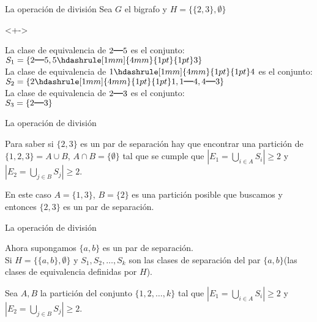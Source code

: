 \documentclass[spanish]{beamer}
\begin{document}
\begin{frame}{La operación de división}
  Sea $G$ el bigrafo y $H=\{\{2, 3\},  \emptyset\}$
\begin{example}<+->
  \centering
  \end{example}
  \begin{block}{}
 La clase de equivalencia de $2\rule[1mm]{4mm}{0.3mm}5$ es el conjunto:\\
$S_{1} = \{2\rule[1mm]{4mm}{0.3mm}5, 5 \hdashrule[1mm]{4mm}{1pt}{1pt} 3\}$\\
La clase de equivalencia de $1\hdashrule[1mm]{4mm}{1pt}{1pt} 4$ es el conjunto:\\
$S_{2} = \{2 \hdashrule[1mm]{4mm}{1pt}{1pt} 1, 1\rule[1mm]{4mm}{0.3mm}4, 4\rule[1mm]{4mm}{0.3mm}3\}$\\
La clase de equivalencia de $2\rule[1mm]{4mm}{0.3mm}3$ es el conjunto:\\
$S_{3} = \{2\rule[1mm]{4mm}{0.3mm}3\}$\\ 
  \end{block}
\end{frame}

\begin{frame}{La operación de división}
\begin{block}{}
Para saber si $\{2,3\}$ es un par de separación hay que encontrar una partición de $\{1, 2, 3\} = A \cup B$, $A \cap B = \{\emptyset\}$ tal que se cumple que $|E_{1} = \bigcup_{i \in A} S_i| \geq 2$ y $ |E_{2}= \bigcup_{j \in B} S_j| \geq 2$.\\
\end{block}
\begin{block}{}
 En este caso $A = \{1, 3\}$, $B=\{2\}$ es una partición posible que buscamos y entonces  $\{2, 3\}$ es un par de separación.\\
\end{block}
\end{frame}

\begin{frame}{La operación de división}
\begin{block}{}
Ahora supongamos $\{a, b\}$ es un par de separación. \\Si $H=\{\{a, b\}, \emptyset\}$ y $S_{1},S_{2}, \ldots, S_{k}$ son las clases de separación del par $\{a, b\}$(las clases de equivalencia definidas por $H$).
\end{block}
\begin{block}{}
Sea $A, B$ la partición del conjunto $\{1,2,\ldots,k\}$ tal que $|E_1 = \bigcup_{i \in A} S_i| \geq 2$ y $ |E_{2}= \bigcup_{j \in B} S_j| \geq 2$. 
\end{block}
\end{frame}
\end{document}
